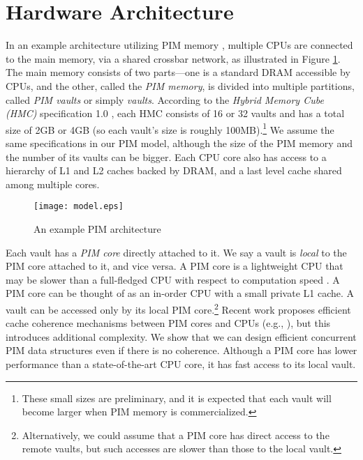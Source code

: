 \section{Hardware Architecture}


\label{section:hardware_model}

In an example architecture utilizing PIM memory \cite{Ahn2015:2,
  Zhang2014:TTP, Ahn2015:1, boroumand2016}, multiple CPUs are
connected to the main memory, via a shared crossbar network, as
illustrated in Figure \ref{figure:model}.  The main memory consists of
two parts---one is a standard DRAM accessible by CPUs, and the other,
called the \textit{PIM memory}, is divided into multiple partitions,
called \textit{PIM vaults} or simply \textit{vaults}.  According to
the \textit{Hybrid Memory Cube (HMC)} specification 1.0
\cite{website:HMC}, each HMC consists of 16 or 32 vaults and has a
total size of 2GB or 4GB (so each vault's size is roughly
100MB).\footnote{ These small sizes are preliminary, and it is expected
  that each vault will become larger when PIM memory is
  commercialized.}  We assume the same specifications in our PIM
model, although the size of the PIM memory and the number of its
vaults can be bigger.  Each CPU core also has access to a hierarchy of
L1 and L2 caches backed by DRAM, and a last level cache shared among
multiple cores.

\begin{figure}[ht!]
\centering
\texttt{[image: model.eps]}
\caption{An example PIM architecture}
\label{figure:model}
\end{figure}

Each vault has a \textit{PIM core} directly attached to it.  We say a
vault is \textit{local} to the PIM core attached to it, and vice
versa.  A PIM core is a lightweight CPU that may be slower than a
full-fledged CPU with respect to computation speed \cite{Ahn2015:2}.
A PIM core can be thought of as an in-order CPU with a small private
L1 cache.  A vault can be accessed only by its local PIM
core.\footnote{ Alternatively, we could assume that a PIM core has
  direct access to the remote vaults, but such accesses are slower
  than those to the local vault.}  Recent work proposes efficient
cache coherence mechanisms between PIM cores and CPUs (e.g.,
\cite{boroumand2016, Ahn2015:1}), but this introduces additional
complexity.  We show that we can design efficient concurrent PIM data
structures even if there is no coherence.  Although a PIM core has
lower performance than a state-of-the-art CPU core, it has fast access
to its local vault.

